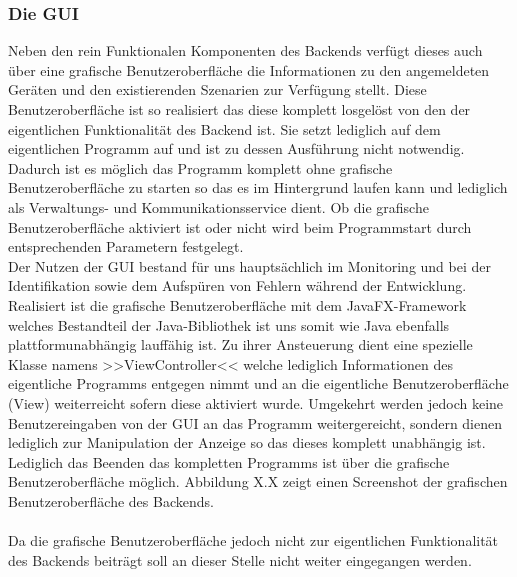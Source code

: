\subsubsection{Die GUI}
Neben den rein Funktionalen Komponenten des Backends verfügt dieses auch über eine grafische Benutzeroberfläche die Informationen zu
den angemeldeten Geräten und den existierenden Szenarien zur Verfügung stellt. Diese Benutzeroberfläche ist so realisiert das diese 
komplett losgelöst von den der eigentlichen Funktionalität des Backend ist. Sie setzt lediglich auf dem eigentlichen Programm auf und
ist zu dessen Ausführung nicht notwendig. Dadurch ist es möglich das Programm komplett ohne grafische Benutzeroberfläche zu starten so
das es im Hintergrund laufen kann und lediglich als Verwaltungs- und Kommunikationsservice dient. Ob die grafische Benutzeroberfläche 
aktiviert ist oder nicht wird beim Programmstart durch entsprechenden Parametern festgelegt. \\
Der Nutzen der GUI bestand für uns hauptsächlich im Monitoring und bei der Identifikation sowie dem Aufspüren von Fehlern während der 
Entwicklung. \\
Realisiert ist die grafische Benutzeroberfläche mit dem JavaFX-Framework welches Bestandteil der Java-Bibliothek ist uns somit wie 
Java ebenfalls plattformunabhängig lauffähig ist. Zu ihrer Ansteuerung dient eine spezielle Klasse namens
>>ViewController<< welche lediglich Informationen des eigentliche Programms entgegen nimmt und an die eigentliche Benutzeroberfläche 
(View) weiterreicht sofern diese aktiviert wurde. Umgekehrt werden jedoch keine Benutzereingaben von der GUI an das Programm 
weitergereicht, sondern dienen lediglich zur Manipulation der Anzeige so das dieses komplett unabhängig ist. Lediglich das Beenden 
das kompletten Programms ist über die grafische Benutzeroberfläche möglich.
Abbildung X.X zeigt einen Screenshot der grafischen Benutzeroberfläche des Backends. \\
\\
Da die grafische Benutzeroberfläche jedoch nicht zur eigentlichen Funktionalität des Backends beiträgt soll an dieser Stelle nicht 
weiter eingegangen werden.

